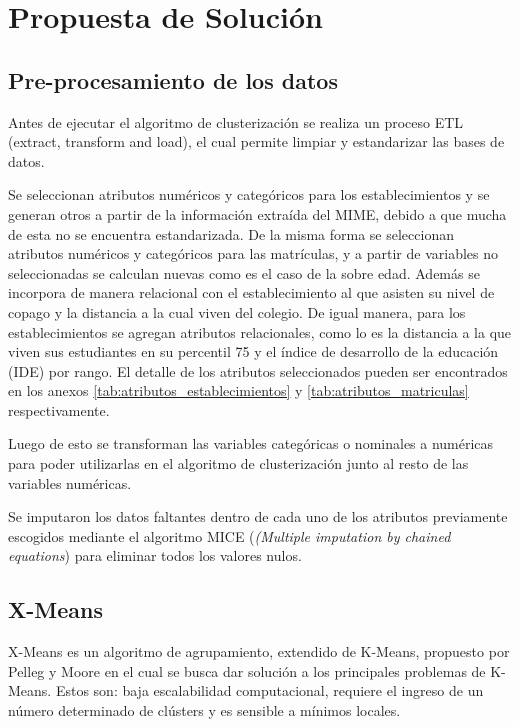 \chapter{Propuesta de Solución}

\section{Pre-procesamiento de los datos}

Antes de ejecutar el algoritmo de clusterización se realiza un proceso ETL (extract, transform and load), el cual permite limpiar y estandarizar las bases de datos.

Se seleccionan atributos numéricos y categóricos para los establecimientos y se generan otros a partir de la información extraída del MIME\cite{MIME}, debido a que mucha de esta no se encuentra estandarizada. De la misma forma se seleccionan atributos numéricos y categóricos para las matrículas, y a partir de variables no seleccionadas se calculan nuevas como es el caso de la sobre edad. Además se incorpora de manera relacional con el establecimiento al que asisten su nivel de copago y la distancia a la cual viven del colegio. De igual manera, para los establecimientos se agregan atributos relacionales, como lo es la distancia a la que viven sus estudiantes en su percentil 75 y el índice de desarrollo de la educación (IDE) por rango. El detalle de los atributos seleccionados pueden ser encontrados en los anexos \ref{tab:atributos_establecimientos} y \ref{tab:atributos_matriculas} respectivamente.

Luego de esto se transforman las variables categóricas o nominales a numéricas para poder utilizarlas en el algoritmo de clusterización junto al resto de las variables numéricas.

Se imputaron los datos faltantes dentro de cada uno de los atributos previamente escogidos mediante el algoritmo MICE (\textit{(Multiple imputation by chained equations}) para eliminar todos los valores nulos.

\section{X-Means}

X-Means es un algoritmo de agrupamiento, extendido de K-Means, propuesto por Pelleg y Moore \cite{Pelleg00x-means:extending} en el cual se busca dar solución a los principales problemas de K-Means. Estos son: baja escalabilidad computacional, requiere el ingreso de un número determinado de clústers y es sensible a mínimos locales.

